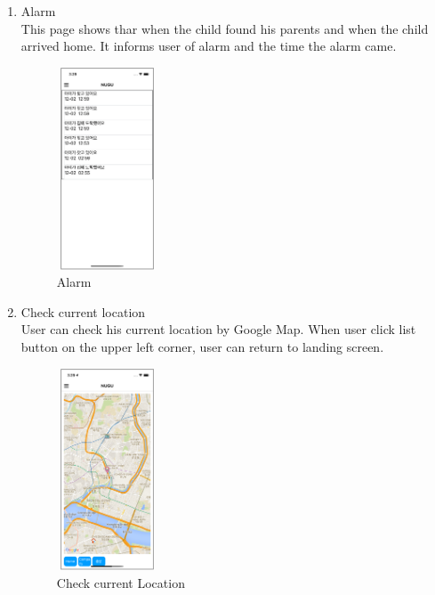 \documentclass[conference]{IEEEtran}
\begin{document}
\begin{enumerate}
    \item Alarm\\
    This page shows thar when the child found his parents and when the child arrived home. It informs user of alarm and the time the alarm came.
    \begin{figure}[htbp]
        \centering
        \includegraphics[width=3cm, height=6cm]{images/figure11.png}
        \caption{Alarm}
    \end{figure}
    
    \item Check current location\\
    User can check his current location by Google Map. When user click list button on the upper left corner, user can return to landing screen.
    \begin{figure}[htbp]
        \centering
        \includegraphics[width=3cm, height=6cm]{images/figure12.png}
        \caption{Check current Location}
    \end{figure}
    

\end{enumerate}
\end{document}
